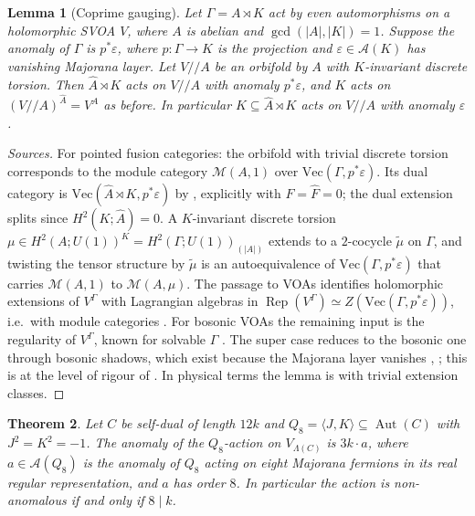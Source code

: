 \documentclass[11pt]{amsart}
\newtheorem{theorem}{Theorem}[section]
\newtheorem{lemma}[theorem]{Lemma}
\theoremstyle{definition}
\newcommand{\Aut}{\operatorname{Aut}}
\begin{document}
\begin{lemma}[Coprime gauging]\label{lem:gauge}
Let $\Gamma=A\rtimes K$ act by even automorphisms on a holomorphic SVOA $V$, where $A$ is abelian and
$\gcd(|A|,|K|)=1$. Suppose the anomaly of $\Gamma$ is $p^*\varepsilon$, where $p\colon\Gamma\to K$ is the
projection and $\varepsilon\in\mathcal A(K)$ has vanishing Majorana layer. Let $V/\!\!/A$ be an orbifold by $A$
with $K$-invariant discrete torsion. Then $\hat A\rtimes K$ acts on $V/\!\!/A$ with anomaly $p^*\varepsilon$,
and $K$ acts on $(V/\!\!/A)^{\hat A}=V^A$ as before. In particular $K\subseteq\hat A\rtimes K$ acts on
$V/\!\!/A$ with anomaly $\varepsilon$.
\end{lemma}

\begin{proof}[Sources]
For pointed fusion categories: the orbifold with trivial discrete torsion corresponds to the module
category $\mathcal M(A,1)$ over $\mathrm{Vec}(\Gamma,p^*\varepsilon)$. Its dual category is
$\mathrm{Vec}(\hat A\rtimes K,p^*\varepsilon)$ by \cite[Thm.~4.9]{Naidu}, explicitly \cite[Thm.~3.7]{Uribe}
with $F=\hat F=0$; the dual extension splits since $H^2(K;\hat A)=0$. A $K$-invariant discrete torsion
$\mu\in H^2(A;U(1))^K=H^2(\Gamma;U(1))_{(|A|)}$ extends to a $2$-cocycle $\tilde\mu$ on $\Gamma$, and
twisting the tensor structure by $\tilde\mu$ is an autoequivalence of $\mathrm{Vec}(\Gamma,p^*\varepsilon)$
that carries $\mathcal M(A,1)$ to $\mathcal M(A,\mu)$. The passage to VOAs identifies holomorphic extensions
of $V^\Gamma$ with Lagrangian algebras in $\operatorname{Rep}(V^\Gamma)\simeq Z(\mathrm{Vec}(\Gamma,
p^*\varepsilon))$, i.e.\ with module categories \cite[Prop.~2.2.1 and the proof of Prop.~2.3.1]{JF}. For
bosonic VOAs the remaining input is the regularity of $V^\Gamma$, known for solvable $\Gamma$ \cite{CM}. The super case reduces to the bosonic
one through bosonic shadows, which exist because the Majorana layer vanishes \cite[\S2.4]{JF}, \cite{BGK};
this is at the level of rigour of \cite[Thm.~4.2]{GJF}. In physical terms the lemma is
\cite[\S2.4, Claim]{Tachikawa} with trivial extension classes.
\end{proof}

\begin{theorem}\label{thm:q8}
Let $C$ be self-dual of length $12k$ and $Q_8=\langle J,K\rangle\subseteq\Aut(C)$ with
$J^2=K^2=-1$. The anomaly of the $Q_8$-action on $V_{\Lambda(C)}$ is $3k\cdot a$, where
$a\in\mathcal A(Q_8)$ is the anomaly of $Q_8$ acting on eight Majorana fermions in its real regular
representation, and $a$ has order $8$. In particular the action is non-anomalous if and only if
$8\mid k$.
\end{theorem}
\end{document}
